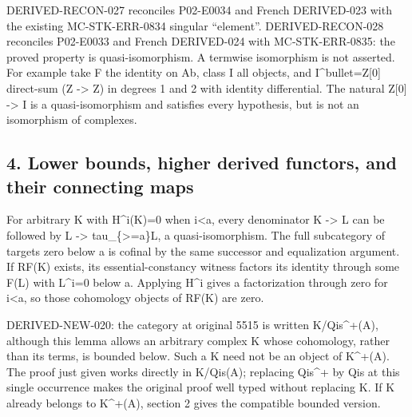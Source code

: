 DERIVED-RECON-027 reconciles P02-E0034 and French DERIVED-023 with the existing MC-STK-ERR-0834 singular ``element''. DERIVED-RECON-028 reconciles P02-E0033 and French DERIVED-024 with MC-STK-ERR-0835:\allowbreak{} the proved property is quasi-isomorphism. A termwise isomorphism is not asserted. For example take F the identity on Ab,\allowbreak{} class I all objects,\allowbreak{} and I\textasciicircum{}bullet\allowbreak{}=Z[0]\allowbreak{} direct-sum (Z \allowbreak{}-> Z)\allowbreak{} in degrees 1 and 2 with identity differential. The natural Z[0]\allowbreak{} \allowbreak{}-> I is a quasi-isomorphism and satisfies every hypothesis,\allowbreak{} but is not an isomorphism of complexes.

\subsection{\texorpdfstring{4. Lower bounds,\allowbreak{} higher derived functors,\allowbreak{} and their connecting maps}{4. Lower  higher derived  and their connecting maps}}\label{proofs-5091-5900-lower-bounds-higher-derived-functors-and-their-connecting-maps}

For arbitrary K with H\textasciicircum{}i(K)\allowbreak{}\allowbreak{}=0 when i<a,\allowbreak{} every denominator K \allowbreak{}-> L can be followed by L \allowbreak{}-> tau\_\allowbreak{}\{>\allowbreak{}=a\}L,\allowbreak{} a quasi-isomorphism. The full subcategory of targets zero below a is cofinal by the same successor and equalization argument. If RF(K)\allowbreak{} exists,\allowbreak{} its essential-constancy witness factors its identity through some F(L)\allowbreak{} with L\textasciicircum{}i\allowbreak{}=0 below a. Applying H\^{}i gives a factorization through zero for i<a,\allowbreak{} so those cohomology objects of RF(K)\allowbreak{} are zero.

DERIVED-NEW-020:\allowbreak{} the category at original 5515 is written K/\allowbreak{}Qis\textasciicircum{}\allowbreak{}+(A)\allowbreak{},\allowbreak{} although this lemma allows an arbitrary complex K whose cohomology,\allowbreak{} rather than its terms,\allowbreak{} is bounded below. Such a K need not be an object of K\textasciicircum{}\allowbreak{}+(A)\allowbreak{}. The proof just given works directly in K/\allowbreak{}Qis(A)\allowbreak{}; replacing Qis\textasciicircum{}\allowbreak{}+ by Qis at this single occurrence makes the original proof well typed without replacing K. If K already belongs to K\textasciicircum{}\allowbreak{}+(A)\allowbreak{},\allowbreak{} section 2 gives the compatible bounded version.

